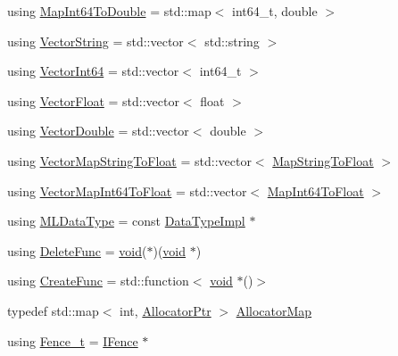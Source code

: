 \begin{DoxyCompactItemize}
\item 
using \mbox{\hyperlink{namespaceonnxruntime_a16918e983bd34c8bee7725fc39740cf1}{Map\+Int64\+To\+Double}} = std\+::map$<$ int64\+\_\+t, double $>$
\item 
using \mbox{\hyperlink{namespaceonnxruntime_a5673dbc843633267038ba098bc783f6d}{Vector\+String}} = std\+::vector$<$ std\+::string $>$
\item 
using \mbox{\hyperlink{namespaceonnxruntime_a1e83a297d78e79ab3df3afd3827ea78e}{Vector\+Int64}} = std\+::vector$<$ int64\+\_\+t $>$
\item 
using \mbox{\hyperlink{namespaceonnxruntime_a00d910cce3d8439516f44da75eb583e8}{Vector\+Float}} = std\+::vector$<$ float $>$
\item 
using \mbox{\hyperlink{namespaceonnxruntime_a99e5a794fb266de779627b0dd8136ea1}{Vector\+Double}} = std\+::vector$<$ double $>$
\item 
using \mbox{\hyperlink{namespaceonnxruntime_ad81ea65e662ec287bc0dba29bdc641a0}{Vector\+Map\+String\+To\+Float}} = std\+::vector$<$ \mbox{\hyperlink{namespaceonnxruntime_af68ce46a8b6ce3aecf826a569e1e9b62}{Map\+String\+To\+Float}} $>$
\item 
using \mbox{\hyperlink{namespaceonnxruntime_ab31c3ad253dd12c1ed233e886fc5205b}{Vector\+Map\+Int64\+To\+Float}} = std\+::vector$<$ \mbox{\hyperlink{namespaceonnxruntime_ab3c488c9d67df3d8a91c90f9bb360e93}{Map\+Int64\+To\+Float}} $>$
\item 
using \mbox{\hyperlink{namespaceonnxruntime_ad77d0a6e838ec7da5dc35fed5ee66b49}{M\+L\+Data\+Type}} = const \mbox{\hyperlink{classonnxruntime_1_1DataTypeImpl}{Data\+Type\+Impl}} $\ast$
\item 
using \mbox{\hyperlink{namespaceonnxruntime_a8dcea0e1aa8476e3d09d5a44a0ca4516}{Delete\+Func}} = \mbox{\hyperlink{mlasi_8h_a88f941d423cb2a819b70a1358982b1a6}{void}}($\ast$)(\mbox{\hyperlink{mlasi_8h_a88f941d423cb2a819b70a1358982b1a6}{void}} $\ast$)
\item 
using \mbox{\hyperlink{namespaceonnxruntime_a4e4e007092b50ccad0f64e24d7ac3c1e}{Create\+Func}} = std\+::function$<$ \mbox{\hyperlink{mlasi_8h_a88f941d423cb2a819b70a1358982b1a6}{void}} $\ast$()$>$
\item 
typedef std\+::map$<$ int, \mbox{\hyperlink{namespaceonnxruntime_a6cdac724c5dcefded3a63f08dae58fda}{Allocator\+Ptr}} $>$ \mbox{\hyperlink{namespaceonnxruntime_a1e552cdfa7d026fd643f9542b1037e92}{Allocator\+Map}}
\item 
using \mbox{\hyperlink{namespaceonnxruntime_a71ef3c4da6339a3625cdf4c4937e4913}{Fence\+\_\+t}} = \mbox{\hyperlink{classonnxruntime_1_1IFence}{I\+Fence}} $\ast$

\end{DoxyCompactItemize}
